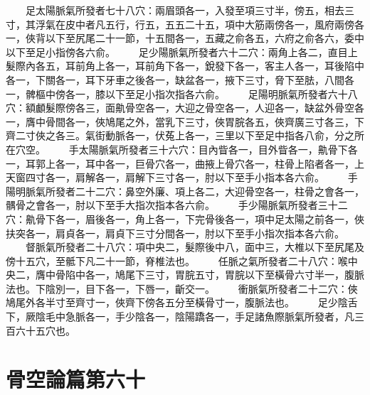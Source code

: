 　　足太陽脈氣所發者七十八穴：兩眉頭各一，入發至項三寸半，傍五，相去三寸，其浮氣在皮中者凡五行，行五，五五二十五，項中大筋兩傍各一，風府兩傍各一，俠背以下至尻尾二十一節，十五間各一，五藏之俞各五，六府之俞各六，委中以下至足小指傍各六俞。
　　足少陽脈氣所發者六十二穴：兩角上各二，直目上髮際內各五，耳前角上各一，耳前角下各一，銳發下各一，客主人各一，耳後陷中各一，下關各一，耳下牙車之後各一，缺盆各一，掖下三寸，脅下至胠，八間各一，髀樞中傍各一，膝以下至足小指次指各六俞。
　　足陽明脈氣所發者六十八穴：額顱髮際傍各三，面鼽骨空各一，大迎之骨空各一，人迎各一，缺盆外骨空各一，膺中骨間各一，俠鳩尾之外，當乳下三寸，俠胃脘各五，俠齊廣三寸各三，下齊二寸俠之各三。氣街動脈各一，伏菟上各一，三里以下至足中指各八俞，分之所在穴空。
　　手太陽脈氣所發者三十六穴：目內眥各一，目外眥各一，鼽骨下各一，耳郭上各一，耳中各一，巨骨穴各一，曲掖上骨穴各一，柱骨上陷者各一，上天窗四寸各一，肩解各一，肩解下三寸各一，肘以下至手小指本各六俞。
　　手陽明脈氣所發者二十二穴：鼻空外廉、項上各二，大迎骨空各一，柱骨之會各一，髃骨之會各一，肘以下至手大指次指本各六俞。
　　手少陽脈氣所發者三十二穴：鼽骨下各一，眉後各一，角上各一，下完骨後各一，項中足太陽之前各一，俠扶突各一，肩貞各一，肩貞下三寸分間各一，肘以下至手小指次指本各六俞。
　　督脈氣所發者二十八穴：項中央二，髮際後中八，面中三，大椎以下至尻尾及傍十五穴，至骶下凡二十一節，脊椎法也。
　　任脈之氣所發者二十八穴：喉中央二，膺中骨陷中各一，鳩尾下三寸，胃脘五寸，胃脘以下至橫骨六寸半一，腹脈法也。下陰別一，目下各一，下唇一，齗交一。
　　衝脈氣所發者二十二穴：俠鳩尾外各半寸至齊寸一，俠齊下傍各五分至橫骨寸一，腹脈法也。
　　足少陰舌下，厥陰毛中急脈各一，手少陰各一，陰陽蹻各一，手足諸魚際脈氣所發者，凡三百六十五穴也。


\section{骨空論篇第六十}

